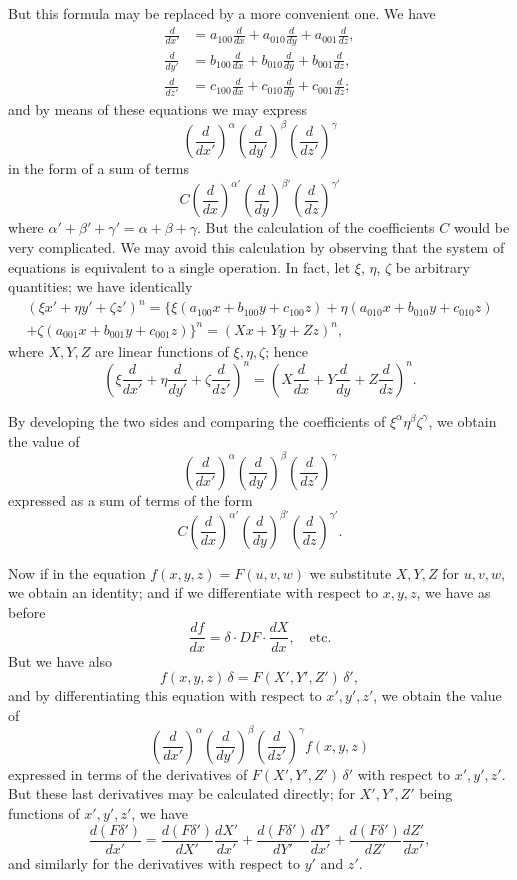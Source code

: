 \documentclass[11pt,a4paper]{article}
\begin{document}
But this formula may be replaced by a more convenient one. We have
\begin{align*}
\frac{d}{dx'} &= a_{100}\frac{d}{dx} + a_{010}\frac{d}{dy} + a_{001}\frac{d}{dz}, \\
\frac{d}{dy'} &= b_{100}\frac{d}{dx} + b_{010}\frac{d}{dy} + b_{001}\frac{d}{dz}, \\
\frac{d}{dz'} &= c_{100}\frac{d}{dx} + c_{010}\frac{d}{dy} + c_{001}\frac{d}{dz};
\end{align*}
and by means of these equations we may express
\[
\left(\frac{d}{dx'}\right)^\alpha
\left(\frac{d}{dy'}\right)^\beta
\left(\frac{d}{dz'}\right)^\gamma
\]
in the form of a sum of terms
\[
C \left(\frac{d}{dx}\right)^{\alpha'} \left(\frac{d}{dy}\right)^{\beta'} \left(\frac{d}{dz}\right)^{\gamma'}
\]
where $\alpha'+\beta'+\gamma' = \alpha+\beta+\gamma$. But the calculation of the coefficients $C$ would be very complicated. We may avoid this calculation by observing that the system of equations is equivalent to a single operation. In fact, let $\xi$, $\eta$, $\zeta$ be arbitrary quantities; we have identically
\begin{multline*}
(\xi x' + \eta y' + \zeta z')^n
= \{ \xi(a_{100}x + b_{100}y + c_{100}z)
+ \eta(a_{010}x + b_{010}y + c_{010}z) \\
+ \zeta(a_{001}x + b_{001}y + c_{001}z) \}^n
= (Xx + Yy + Zz)^n,
\end{multline*}
where $X,Y,Z$ are linear functions of $\xi,\eta,\zeta$; hence
\[
\left(\xi\frac{d}{dx'} + \eta\frac{d}{dy'} + \zeta\frac{d}{dz'}\right)^n
= \left(X\frac{d}{dx} + Y\frac{d}{dy} + Z\frac{d}{dz}\right)^n.
\]

\setcounter{page}{57}

By developing the two sides and comparing the coefficients of $\xi^\alpha\eta^\beta\zeta^\gamma$, we obtain the value of
\[
\left(\frac{d}{dx'}\right)^\alpha
\left(\frac{d}{dy'}\right)^\beta
\left(\frac{d}{dz'}\right)^\gamma
\]
expressed as a sum of terms of the form
\[
C \left(\frac{d}{dx}\right)^{\alpha'} \left(\frac{d}{dy}\right)^{\beta'} \left(\frac{d}{dz}\right)^{\gamma'}.
\]

Now if in the equation $f(x,y,z)=F(u,v,w)$ we substitute $X,Y,Z$ for $u,v,w$, we obtain an identity; and if we differentiate with respect to $x,y,z$, we have as before
\[
\frac{df}{dx} = \delta \cdot DF \cdot \frac{dX}{dx}, \quad \text{etc.}
\]
But we have also
\[
f(x,y,z)\,\delta = F(X',Y',Z')\,\delta',
\]
and by differentiating this equation with respect to $x',y',z'$, we obtain the value of
\[
\left(\frac{d}{dx'}\right)^\alpha
\left(\frac{d}{dy'}\right)^\beta
\left(\frac{d}{dz'}\right)^\gamma f(x,y,z)
\]
expressed in terms of the derivatives of $F(X',Y',Z')\,\delta'$ with respect to $x',y',z'$. But these last derivatives may be calculated directly; for $X',Y',Z'$ being functions of $x',y',z'$, we have
\[
\frac{d(F\delta')}{dx'} = \frac{d(F\delta')}{dX'}\frac{dX'}{dx'} + \frac{d(F\delta')}{dY'}\frac{dY'}{dx'} + \frac{d(F\delta')}{dZ'}\frac{dZ'}{dx'},
\]
and similarly for the derivatives with respect to $y'$ and $z'$.
\end{document}
